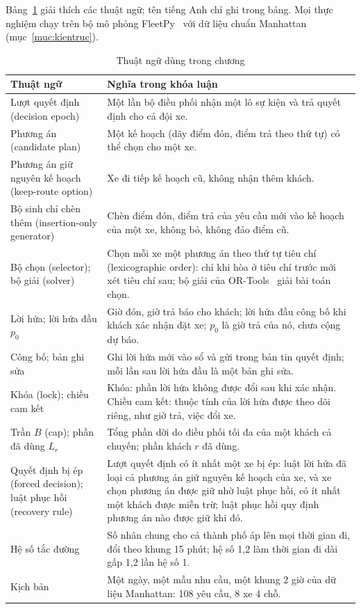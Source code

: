 Bảng~\ref{bang:thuatngu} giải thích các thuật ngữ; tên tiếng Anh chỉ ghi trong bảng. Mọi thực nghiệm chạy trên
bộ mô phỏng FleetPy~\cite{engelhardt2026} với dữ liệu chuẩn Manhattan (mục~\ref{muc:kientruc}).

\begin{table}[htbp]
\centering
\caption{Thuật ngữ dùng trong chương}
\label{bang:thuatngu}
\small
\begin{tabular}{@{}p{4.3cm}p{10.5cm}@{}}
\toprule
\textbf{Thuật ngữ} & \textbf{Nghĩa trong khóa luận}\\
\midrule
Lượt quyết định (decision epoch) & Một lần bộ điều phối nhận một lô sự kiện và trả quyết định cho cả đội xe.\\
Phương án (candidate plan) & Một kế hoạch (dãy điểm đón, điểm trả theo thứ tự) có thể chọn cho một xe.\\
Phương án giữ nguyên kế hoạch (keep-route option) & Xe đi tiếp kế hoạch cũ, không nhận thêm khách.\\
Bộ sinh chỉ chèn thêm (insertion-only generator) & Chèn điểm đón, điểm trả của yêu cầu mới vào kế hoạch của
một xe, không bỏ, không đảo điểm cũ.\\
Bộ chọn (selector); bộ giải (solver) & Chọn mỗi xe một phương án theo thứ tự tiêu chí (lexicographic order):
chỉ khi hòa ở tiêu chí trước mới xét tiêu chí sau; bộ giải của OR-Tools~\cite{ortools} giải bài toán chọn.\\
Lời hứa; lời hứa đầu $p_0$ & Giờ đón, giờ trả báo cho khách; lời hứa đầu công bố khi khách xác nhận đặt xe;
$p_0$ là giờ trả của nó, chưa cộng dự báo.\\
Công bố; bản ghi sửa & Ghi lời hứa mới vào sổ và gửi trong bản tin quyết định; mỗi lần sau lời hứa đầu là một
bản ghi sửa.\\
Khóa (lock); chiều cam kết & Khóa: phần lời hứa không được đổi sau khi xác nhận. Chiều cam kết: thuộc tính của
lời hứa được theo dõi riêng, như giờ trả, việc đổi xe.\\
Trần $B$ (cap); phần đã dùng $L_r$ & Tổng phần dời do điều phối tối đa của một khách cả chuyến; phần khách $r$
đã dùng.\\
Quyết định bị ép (forced decision); luật phục hồi (recovery rule) & Lượt quyết định có ít nhất một xe bị ép:
luật lời hứa đã loại cả phương án giữ nguyên kế hoạch của xe, và xe chọn phương án được giữ nhờ luật phục hồi,
có ít nhất một khách được miễn trừ; luật phục hồi quy định phương án nào được giữ khi đó.\\
Hệ số tắc đường & Số nhân chung cho cả thành phố áp lên mọi thời gian đi, đổi theo khung 15 phút; hệ số 1,2 làm
thời gian đi dài gấp 1,2 lần hệ số 1.\\
Kịch bản & Một ngày, một mẫu nhu cầu, một khung 2 giờ của dữ liệu Manhattan: 108 yêu cầu, 8 xe 4 chỗ.\\
\bottomrule
\end{tabular}
\end{table}

